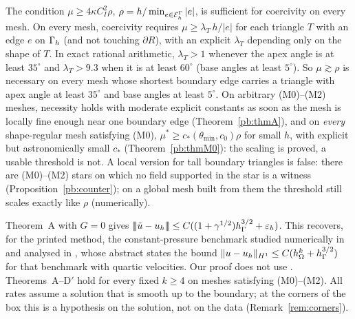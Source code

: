\begin{propositionE}
The condition $\mu\ge4\kappa C_I^2\rho$, $\rho=h/\min_{e\in\mathcal E_h^\Gamma}|e|$, is sufficient for coercivity on every mesh. On every mesh, coercivity requires $\mu\ge\lambda_T\,h/|e|$ for each triangle $T$ with an edge $e$ on $\Gamma_h$ (and not touching $\partial R$), with an explicit $\lambda_T$ depending only on the shape of $T$. In exact rational arithmetic, $\lambda_T>1$ whenever the apex angle is at least $35^\circ$ and $\lambda_T>9.3$ when it is at least $60^\circ$ (base angles at least $5^\circ$). So $\mu\gtrsim\rho$ is necessary on every mesh whose shortest boundary edge carries a triangle with apex angle at least $35^\circ$ and base angles at least $5^\circ$. On arbitrary (M0)--(M2) meshes, necessity holds with moderate explicit constants as soon as the mesh is locally fine enough near one boundary edge (Theorem~\ref{pb:thmA}), and on \emph{every} shape-regular mesh satisfying (M0), $\mu^\ast\ge c_\ast(\theta_{\min},c_0)\rho$ for small $h$, with explicit but astronomically small $c_\ast$ (Theorem~\ref{pb:thmM0}): the scaling is proved, a usable threshold is not. A local version for tall boundary triangles is false: there are (M0)--(M2) stars on which no field supported in the star is a witness (Proposition~\ref{pb:counter}); on a global mesh built from them the threshold still scales exactly like $\rho$ (numerically).
\end{propositionE}

Theorem~A with $G=0$ gives $|\!|\!|\tilde u-u_h|\!|\!|\le C((1+\gamma^{1/2})h_\Gamma^{3/2}+\varepsilon_h)$. This recovers, for the printed method, the constant-pressure benchmark studied numerically in \cite{GjerdeScott2024,ScottPrize} and analysed in \cite{Cavalcante}, whose abstract states the bound $\lVert u-u_h\rVert_{H^1}\le C(h_\Omega^k+h_\Gamma^{3/2})$ for that benchmark with quartic velocities. Our proof does not use \cite{Cavalcante}. Theorems~A--D$'$ hold for every fixed $k\ge4$ on meshes satisfying (M0)--(M2). All rates assume a solution that is smooth up to the boundary; at the corners of the box this is a hypothesis on the solution, not on the data (Remark~\ref{rem:corners}).

